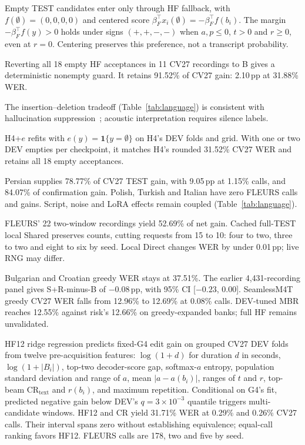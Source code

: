 
Empty TEST candidates enter only through HF fallback, with $f(\emptyset)=(0,0,0,0)$ and centered score $\beta_F^\top x_i(\emptyset)=-\beta_F^\top f(b_i)$. The margin $-\beta_F^\top f(y)>0$ holds under signs $(+,+,-,-)$ when $a,p\le0$, $t>0$ and $r\ge0$, even at $r=0$. Centering preserves this preference, not a transcript probability.

Reverting all 18 empty HF acceptances in 11 CV27 recordings to B gives a deterministic nonempty guard. It retains 91.52\% of CV27 gain: 2.10\,pp at 31.88\% WER.\par
\begin{samepage}
The insertion--deletion tradeoff (Table~\ref{tab:language}) is consistent with hallucination suppression~\cite{baranski2025nonspeech}; acoustic interpretation requires silence labels.\par
\end{samepage}

\begin{samepage}
H4+$e$ refits with $e(y)=\mathbf1\{y=\emptyset\}$ on H4's DEV folds and grid. With one or two DEV empties per checkpoint, it matches H4's rounded 31.52\% CV27 WER and retains all 18 empty acceptances.\par
\end{samepage}

Persian supplies 78.77\% of CV27 TEST gain, with 9.05\,pp at 1.15\% calls, and 84.07\% of confirmation gain. Polish, Turkish and Italian have zero FLEURS calls and gains. Script, noise and LoRA effects remain coupled (Table~\ref{tab:language}).

FLEURS' 22 two-window recordings yield 52.69\% of net gain. Cached full-TEST local Shared preserves counts, cutting requests from 15 to 10: four to two, three to two and eight to six by seed. Local Direct changes WER by under 0.01\,pp; live RNG may differ.

Bulgarian and Croatian greedy WER stays at 37.51\%. The earlier 4,431-recording panel gives S+R-minus-B of $-0.08$\,pp, with 95\% CI [$-0.23$, $0.00$]. SeamlessM4T~\cite{seamless2023,seamlessv1nature} greedy CV27 WER falls from 12.96\% to 12.69\% at 0.08\% calls. DEV-tuned MBR reaches 12.55\% against risk's 12.66\% on greedy-expanded banks; full HF remains unvalidated.

HF12 ridge regression predicts fixed-G4 edit gain on grouped CV27 DEV folds from twelve pre-acquisition features: $\log(1+d)$ for duration $d$ in seconds, $\log(1+|B_i|)$, top-two decoder-score gap, softmax-$a$ entropy, population standard deviation and range of $a$, mean $|a-a(b_i)|$, ranges of $t$ and $r$, top-beam $\mathrm{CR}_{\mathrm{text}}$ and $r(b_i)$, and maximum repetition. Conditional on G4's fit, predicted negative gain below DEV's $q=3\times10^{-3}$ quantile triggers multi-candidate windows. HF12 and CR yield 31.71\% WER at 0.29\% and 0.26\% CV27 calls. Their interval spans zero without establishing equivalence; equal-call ranking favors HF12. FLEURS calls are 178, two and five by seed.
